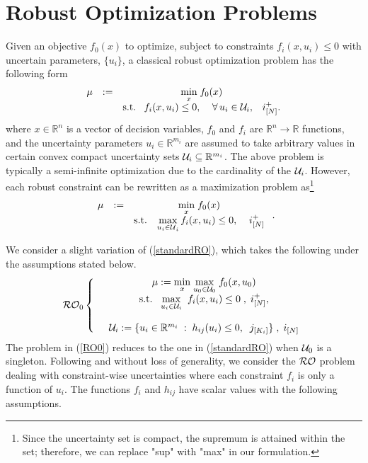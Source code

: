 \documentclass[journal,twoside,web]{ieeecolor}
\newcommand{\real}{\mathbb{R}}
\begin{document}
\section{Robust Optimization Problems}\label{sec_RO}
Given an objective $f_0(x)$ to optimize, subject to constraints $f_i(x,u_i) \leq 0$ with uncertain parameters, $\{u_i\}$, a classical robust optimization problem has the following form
$$
\begin{array}{ccc}
\mu&:=&\underset{x}{\min}\; f_0(x)\\
&&\text{s.t.}\;\;\;f_i(x,u_i)\leq 0,\;\;\;\; \forall \,u_i\in {\cal U}_i,\;\;\;i^+_{[N]}.
\end{array}
$$
where $x\in \real^n$ is a vector of decision variables, $f_0$ and $f_i$ are $\real^n \to \real$ functions, and the uncertainty parameters $u_i \in \real^{m_i}$ are assumed to take arbitrary values in certain convex compact uncertainty sets ${\cal U}_i \subseteq \real^{m_i}$.
The above problem is typically a semi-infinite optimization due to the cardinality of the ${\cal U}_i$. However, each robust constraint can be rewritten as a maximization problem as\footnote{Since the uncertainty set is compact,
the supremum is attained within the set; therefore, we can replace "sup" with "max" in our formulation.}
\begin{align}
\begin{array}{ccc}
\mu&:=&\underset{x}{\min}\; f_0(x)\\
&&\text{s.t.}\;\;\;\displaystyle\max_{{u_i\in \cal U}_i} f_i(x,u_i)\leq 0,\;\;\;\;i^+_{[N]}
\end{array}\;.\label{standardRO}
\end{align}

We consider a slight variation of (\ref{standardRO}), which takes the following under the assumptions stated below.
\begin{equation}\label{RO0}
\mathcal{RO}_0\left\{ \begin{array}{ccc}
&\mu:=\underset{x}{\min} \;\underset{u_0\in {\cal U}_0}{\max}\; f_0(x,u_0)\\
&\text{s.t.}\;\;\;\underset{u_i\in {\cal U}_i}{\max}\;\; f_i(x,u_i)\leq 0\;,\;i^+_{[N]},\\ \\
&{\cal U}_i:=\{u_ i\in \mathbb{R}^{m_i}\;:\;h_{ij}(u_i)\leq 0,\;\;j_{[K_i]}\}\;,\;i_{[N]}
\end{array}\right.
\end{equation}
The problem in (\ref{RO0}) reduces to the one in (\ref{standardRO}) when ${\cal U}_0$ is a singleton.
Following \cite{bental2009-2} and without loss of generality, we consider the ${\cal RO}$ problem dealing with constraint-wise uncertainties where each constraint $f_i$ is only a function of $u_i$.
The functions $f_i$ and $h_{ij}$ have scalar values with the following assumptions.
\end{document}
